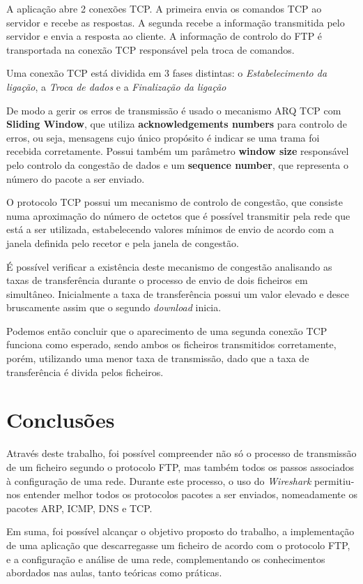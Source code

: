 \documentclass[11pt]{article}
\begin{document}
A aplicação abre 2 conexões TCP. A primeira envia os comandos TCP ao servidor e recebe as respostas. A segunda recebe a informação transmitida pelo servidor e envia a resposta ao cliente. A informação de controlo do FTP é transportada na conexão TCP responsável pela troca de comandos.

Uma conexão TCP está dividida em 3 fases distintas: o \emph{Estabelecimento da ligação}, a \emph{Troca de dados} e a \emph{Finalização da ligação}


De modo a gerir os erros de transmissão é usado o mecanismo ARQ TCP com \textbf{Sliding Window}, que utiliza \textbf{acknowledgements numbers} para controlo de erros, ou seja, mensagens cujo único propósito é indicar se uma trama foi recebida corretamente. Possui também um parâmetro \textbf{window size} responsável pelo controlo da congestão de dados e um \textbf{sequence number}, que representa o número do pacote a ser enviado.

O protocolo TCP possui um mecanismo de controlo de congestão, que consiste numa aproximação do número de octetos que é possível transmitir pela rede que está a ser utilizada, estabelecendo valores mínimos de envio de acordo com a janela definida pelo recetor e pela janela de congestão.

É possível verificar a existência deste mecanismo de congestão analisando as taxas de transferência durante o processo de envio de dois ficheiros em simultâneo. Inicialmente a taxa de transferência possui um valor elevado e desce bruscamente assim que o segundo \textit{download} inicia.

Podemos então concluir que o aparecimento de uma segunda conexão TCP funciona como esperado, sendo ambos os ficheiros transmitidos corretamente, porém, utilizando uma menor taxa de transmissão, dado que a taxa de transferência é divida pelos ficheiros.


\section{Conclusões}

Através deste trabalho, foi possível compreender não só o processo de transmissão de um ficheiro segundo o protocolo FTP, mas também todos os passos associados à configuração de uma rede. Durante este processo, o uso do \textit{Wireshark} permitiu-nos entender melhor todos os protocolos pacotes a ser enviados, nomeadamente os pacotes ARP, ICMP, DNS e TCP.

Em suma, foi possível alcançar o objetivo proposto do trabalho, a implementação de uma aplicação que descarregasse um ficheiro de acordo com o protocolo FTP, e a configuração e análise de uma rede, complementando os conhecimentos abordados nas aulas, tanto teóricas como práticas.
\end{document}
